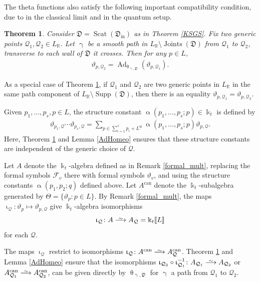 \documentclass{amsart}
\DeclareMathOperator{\In}{in}
\DeclareMathOperator{\Joints}{Joints}
\DeclareMathOperator{\Supp}{Supp}
\DeclareMathOperator{\Ad}{Ad}
\DeclareMathOperator{\can}{can}
\DeclareMathOperator{\scat}{Scat}
\let\llb=\llbracket
\let\rrb=\rrbracket
\let\bb=\mathbb
\let\f=\mathfrak
\def\risom{\buildrel\sim\over{\smashedlongrightarrow}}
\def\smashedlongrightarrow{\setbox0=\hbox{$\longrightarrow$}\ht0=1.25pt\box0}
\newcommand {\kk} {\Bbbk}
\newcommand {\kt} {\kk_t}
\newcommand {\sQ} {\mathcal{Q}}
\renewcommand{\theta}{\uptheta}
\renewcommand{\iota}{\upiota}
\renewcommand{\alpha}{\upalpha}
\renewcommand{\gamma}{\upgamma}
\theoremstyle{plain}%
\newtheorem{thm}{Theorem}[section]
\theoremstyle{definition}
\theoremstyle{remark}
\begin{document}
The theta functions also satisfy the following important compatibility condition, due to \cite{CPS} in the classical limit and \cite[Thm 2.14]{Man3} in the quantum setup.

\begin{thm}\label{CPS}
Consider $\f{D}=\scat(\f{D}_{\In})$ as in Theorem \ref{KSGS}.  Fix two generic points $\sQ_1,\sQ_2\in L_{\bb{R}}$.  Let $\gamma$ be a smooth path in $L_{\bb{R}}\setminus \Joints(\f{D})$ from $\sQ_1$ to $\sQ_2$, transverse to each wall of $\f{D}$ it crosses.  Then for any $p\in L$,
\begin{align*}
    \vartheta_{p,\sQ_2}=\Ad_{\theta_{\gamma,\f{D}}} (\vartheta_{p,\sQ_1}).
\end{align*}
\end{thm}

As a special case of Theorem \ref{CPS}, if $\sQ_1$ and $\sQ_2$ are two generic points in $L_{\bb{R}}$ in the same path component of $L_{\bb{R}}\setminus \Supp(\f{D})$, then there is an equality $\vartheta_{p,\sQ_1}=\vartheta_{p,\sQ_2}$.



Given $p_1,\ldots,p_s,p\in L$, the structure constant $\alpha(p_1,\ldots,p_s;p)\in \kk_t$ is defined by 
\begin{align*}
    \vartheta_{p_1,\sQ}\cdots \vartheta_{p_s,\sQ} = \sum_{p\in \sum_{i=1}^s p_i+L^{\oplus}} \alpha(p_1,\ldots,p_s;p) \vartheta_{p,\sQ}.
\end{align*}
Here, Theorem \ref{CPS} and Lemma \ref{AdHomeo} ensures that these structure constants are independent of the generic choice of $\sQ$.  

Let $A$ denote the $\kk_t$-algebra defined as in Remark \ref{formal_mult}, replacing the formal symbols $\mathscr{F}_v$ there with formal symbols $\vartheta_v$, and using the structure constants $\alpha(p_1,p_2;q)$ defined above.  Let $A^{\can}$ denote the $\kt$-subalgebra generated by $\Theta=\{\vartheta_p\colon p\in L\}$.  By Remark \ref{formal_mult}, the maps $\iota_{\sQ}\colon  \vartheta_p\mapsto \vartheta_{p,\sQ}$ give $\kk_t$-algebra isomorphisms 
\[
\iota_{\sQ}\colon A\risom A_{\sQ}=\kk_t\llb L\rrb
\]
for each $\sQ$.  


The maps $\iota_{\sQ}$ restrict to isomorphisms $\iota_{\sQ}\colon A^{\can}\risom A_{\sQ}^{\can}$.  Theorem \ref{CPS} and Lemma \ref{AdHomeo} ensure that the isomorphisms $\iota_{\sQ_2}\circ \iota_{\sQ_1}^{-1}\colon A_{\sQ_1}\risom A_{\sQ_2}$ or $A_{\sQ_1}^{\can}\risom A_{\sQ_2}^{\can}$, can be given directly by $\theta_{\gamma,\f{D}}$ for $\gamma$ a path from $\sQ_1$ to $\sQ_2$.
\end{document}
